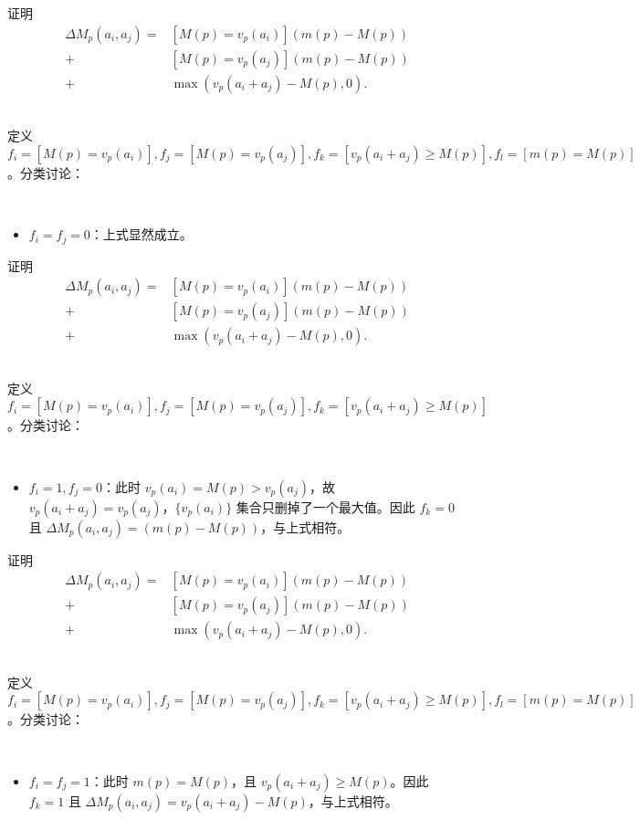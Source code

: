 \documentclass{beamer}
\begin{document}
\begin{frame}{证明}
	\begin{align*}
		\Delta M_p(a_i,a_j) = & [M(p) = v_p(a_i)](m(p) - M(p)) \\
		 + & [M(p) = v_p(a_j)](m(p) - M(p)) \\ 
		 + & \max(v_p(a_i+a_j) - M(p) , 0).
	\end{align*}
	
	~\\
	
	定义 $f_i = [M(p) = v_p(a_i)] , f_j = [M(p) = v_p(a_j)] , f_k = [v_p(a_i+a_j) \ge M(p)] , f_l = [m(p) = M(p)]$。分类讨论：

	~\\
	
	\begin{itemize}
		\item $f_i=f_j= 0$：上式显然成立。
	\end{itemize}
\end{frame}
\begin{frame}{证明}
	\begin{align*}
		\Delta M_p(a_i,a_j) = & [M(p) = v_p(a_i)](m(p) - M(p)) \\
		 + & [M(p) = v_p(a_j)](m(p) - M(p)) \\ 
		 + & \max(v_p(a_i+a_j) - M(p) , 0).
	\end{align*}
	
	~\\
	
	定义 $f_i = [M(p) = v_p(a_i)] , f_j = [M(p) = v_p(a_j)] , f_k = [v_p(a_i+a_j) \ge M(p)]$。分类讨论：
	
	~\\

	\begin{itemize}
		\item $f_i = 1, f_j = 0$：此时 $v_p(a_i) = M(p) > v_p(a_j)$，故 $v_p(a_i+a_j) = v_p(a_j)$，$\{v_p(a_i)\}$ 集合只删掉了一个最大值。因此 $f_k = 0$ 且 $\Delta M_p(a_i, a_j) = (m(p) - M(p))$，与上式相符。
	\end{itemize}
\end{frame}
\begin{frame}{证明}
	\begin{align*}
		\Delta M_p(a_i,a_j) = & [M(p) = v_p(a_i)](m(p) - M(p)) \\
		 + & [M(p) = v_p(a_j)](m(p) - M(p)) \\ 
		 + & \max(v_p(a_i+a_j) - M(p) , 0).
	\end{align*}
	
	~\\
	
	定义 $f_i = [M(p) = v_p(a_i)] , f_j = [M(p) = v_p(a_j)] , f_k = [v_p(a_i+a_j) \ge M(p)] , f_l = [m(p) = M(p)]$。分类讨论：
	
	~\\

	\begin{itemize}
		\item $f_i = f_j = 1$：此时 $m(p) = M(p)$，且 $v_p(a_i+a_j) \ge M(p)$。因此 $f_k = 1$ 且 $\Delta M_p(a_i, a_j) = v_p(a_i+a_j) - M(p)$，与上式相符。
	\end{itemize}
\end{frame}
\end{document}
